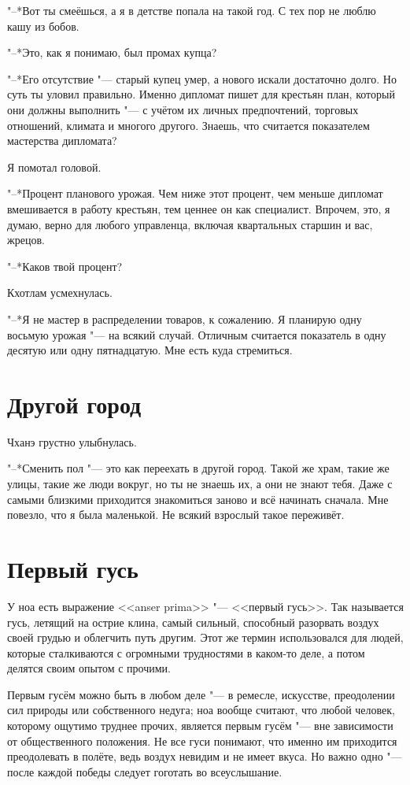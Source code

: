 "--*Вот ты смеёшься, а я в детстве попала на такой год.
С тех пор не люблю кашу из бобов.

"--*Это, как я понимаю, был промах купца?

"--*Его отсутствие "--- старый купец умер, а нового искали достаточно долго.
Но суть ты уловил правильно.
Именно дипломат пишет для крестьян план, который они должны выполнить "--- с учётом их личных предпочтений, торговых отношений, климата и многого другого.
Знаешь, что считается показателем мастерства дипломата?

Я помотал головой.

"--*Процент планового урожая.
Чем ниже этот процент, чем меньше дипломат вмешивается в работу крестьян, тем ценнее он как специалист.
Впрочем, это, я думаю, верно для любого управленца, включая квартальных старшин и вас, жрецов.

"--*Каков твой процент?

Кхотлам усмехнулась.

"--*Я не мастер в распределении товаров, к сожалению.
Я планирую одну восьмую урожая "--- на всякий случай.
Отличным считается показатель в одну десятую или одну пятнадцатую.
Мне есть куда стремиться.

\section{Другой город}

Чханэ грустно улыбнулась.

"--*Сменить пол "--- это как переехать в другой город.
Такой же храм, такие же улицы, такие же люди вокруг, но ты не знаешь их, а они не знают тебя.
Даже с самыми близкими приходится знакомиться заново и всё начинать сначала.
Мне повезло, что я была маленькой.
Не всякий взрослый такое переживёт.

\section{Первый гусь}

У ноа есть выражение <<anser prima>> "--- <<первый гусь>>.
Так называется гусь, летящий на острие клина, самый сильный, способный разорвать воздух своей грудью и облегчить путь другим.
Этот же термин использовался для людей, которые сталкиваются с огромными трудностями в каком-то деле, а потом делятся своим опытом с прочими.

Первым гусём можно быть в любом деле "--- в ремесле, искусстве, преодолении сил природы или собственного недуга;
ноа вообще считают, что любой человек, которому ощутимо труднее прочих, является первым гусём "--- вне зависимости от общественного положения.
Не все гуси понимают, что именно им приходится преодолевать в полёте, ведь воздух невидим и не имеет вкуса.
Но важно одно "--- после каждой победы следует гоготать во всеуслышание.

